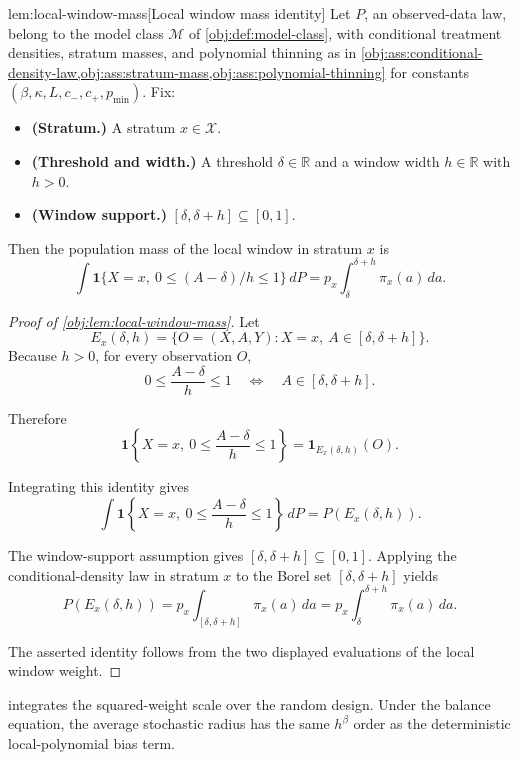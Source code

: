 \documentclass[11pt]{article}
\begin{document}
\begin{lemmav}{lem:local-window-mass}[Local window mass identity]
Let \(P\), an observed-data law, belong to the model class \(\mathcal M\) of \cref{obj:def:model-class}, with conditional treatment densities, stratum masses, and polynomial thinning as in \cref{obj:ass:conditional-density-law,obj:ass:stratum-mass,obj:ass:polynomial-thinning} for constants \((\beta,\kappa,L,c_-,c_+,p_{\min})\).  Fix:
\begin{itemize}
\item \textbf{(Stratum.)} A stratum \(x\in\mathcal X\).
\item \textbf{(Threshold and width.)} A threshold \(\delta\in\mathbb R\) and a window width \(h\in\mathbb R\) with \(h>0\).
\item \textbf{(Window support.)} \([\delta,\delta+h]\subseteq[0,1]\).
\end{itemize}
Then the population mass of the local window in stratum \(x\) is
\[
\int \mathbf 1\{X=x,\ 0\le (A-\delta)/h\le 1\}\,dP
=
p_x\int_{\delta}^{\delta+h}\pi_x(a)\,da.
\]
\end{lemmav}

\begin{proof}[Proof of \cref{obj:lem:local-window-mass}]
Let
\[
E_x(\delta,h)
=
\{O=(X,A,Y):X=x,\ A\in[\delta,\delta+h]\}.
\]
Because \(h>0\), for every observation \(O\),
\[
0\le\frac{A-\delta}{h}\le1
\quad\Longleftrightarrow\quad
A\in[\delta,\delta+h].
\] %

Therefore
\[
\mathbf 1\left\{X=x,\ 0\le\frac{A-\delta}{h}\le1\right\}
=
\mathbf 1_{E_x(\delta,h)}(O).
\] %

Integrating this identity gives
\[
\int
\mathbf 1\left\{X=x,\ 0\le\frac{A-\delta}{h}\le1\right\}\,dP
=
P(E_x(\delta,h)).
\] %

The window-support assumption gives
\([\delta,\delta+h]\subseteq[0,1]\). Applying the conditional-density law in
stratum \(x\) to the Borel set \([\delta,\delta+h]\) yields
\[
P(E_x(\delta,h))
=
p_x\int_{[\delta,\delta+h]}\pi_x(a)\,da
=
p_x\int_{\delta}^{\delta+h}\pi_x(a)\,da .
\] %

The asserted identity follows from the two displayed evaluations of the local window weight. %
\end{proof}

 integrates the squared-weight scale over the random design. Under the balance equation, the average stochastic radius has the same \(h^\beta\) order as the deterministic local-polynomial bias term.
\end{document}
